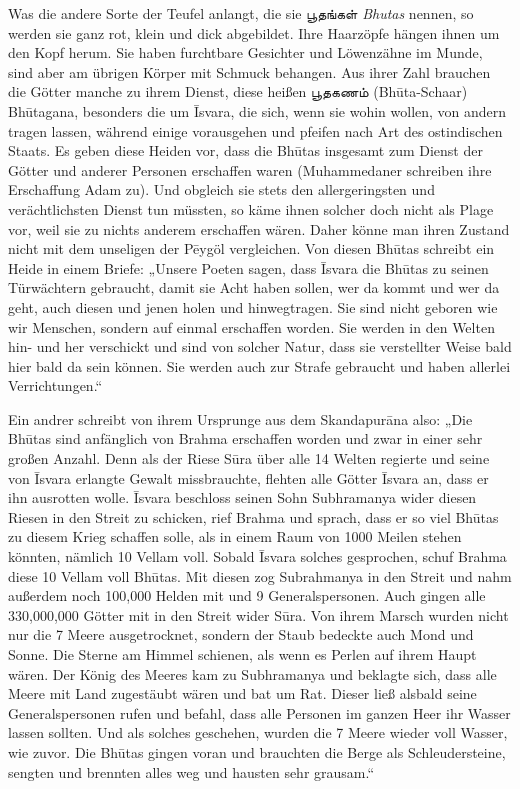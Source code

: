 \documentclass{article}
\newcommand{\TamilText}[1]{\texttamil{#1}}
\newcommand{\tam}[1]{\TamilText{#1}}
\begin{document}
Was die andere Sorte der Teufel anlangt, die sie \tam{பூதங்கள்} \emph{Bhutas} nennen, so werden sie ganz rot, klein und dick abgebildet. Ihre Haarzöpfe hängen ihnen um den Kopf herum. Sie haben furchtbare Gesichter und Löwenzähne im Munde, sind aber am übrigen Körper mit Schmuck behangen. Aus ihrer Zahl brauchen die Götter manche zu ihrem Dienst, diese heißen \tam{பூதகணம்} (Bh\={u}ta-Schaar) Bh\={u}tagana, besonders die um \={I}svara, die sich, wenn sie wohin wollen, von andern tragen lassen, während einige vorausgehen und pfeifen nach Art des ostindischen Staats. Es geben diese Heiden vor, dass die Bh\={u}tas insgesamt zum Dienst der Götter und anderer Personen erschaffen waren (Muhammedaner schreiben ihre Erschaffung Adam zu). Und obgleich sie stets den allergeringsten und verächtlichsten Dienst tun müssten, so käme ihnen solcher doch nicht als Plage vor, weil sie zu nichts anderem erschaffen wären. Daher könne man ihren Zustand nicht mit dem unseligen der P\={e}ygöl vergleichen. Von diesen Bh\={u}tas schreibt ein Heide in einem Briefe: „Unsere Poeten sagen, dass \={I}svara die Bh\={u}tas zu seinen Türwächtern gebraucht, damit sie Acht haben sollen, wer da kommt und wer da geht, auch diesen und jenen holen und hinwegtragen. Sie sind nicht geboren wie wir Menschen, sondern auf einmal erschaffen worden. Sie werden in den Welten hin- und her verschickt und sind von solcher Natur, dass sie verstellter Weise bald hier bald da sein können. Sie werden auch zur Strafe gebraucht und haben allerlei Verrichtungen.“

Ein andrer schreibt von ihrem Ursprunge aus dem Skandapur\={a}na also: „Die Bh\={u}tas sind anfänglich von Brahma erschaffen worden und zwar in einer sehr großen Anzahl. Denn als der Riese S\={u}ra über alle 14 Welten regierte und seine von \={I}svara erlangte Gewalt missbrauchte, flehten alle Götter \={I}svara an, dass er ihn ausrotten wolle. \={I}svara beschloss seinen Sohn Subhramanya wider diesen Riesen in den Streit zu schicken, rief Brahma und sprach, dass er so viel Bh\={u}tas zu diesem Krieg schaffen solle, als in einem Raum von 1000 Meilen stehen könnten, nämlich 10 Vellam voll. Sobald \={I}svara solches gesprochen, schuf Brahma diese 10 Vellam voll Bh\={u}tas. Mit diesen zog Subrahmanya in den Streit und nahm außerdem noch 100,000 Helden mit und 9 Generalspersonen. Auch gingen alle 330,000,000 Götter mit in den Streit wider S\={u}ra. Von ihrem Marsch wurden nicht nur die 7 Meere ausgetrocknet, sondern der Staub bedeckte auch Mond und Sonne. Die Sterne am Himmel schienen, als wenn es Perlen auf ihrem Haupt wären. Der König des Meeres kam zu Subhramanya und beklagte sich, dass alle Meere mit Land zugestäubt wären und bat um Rat. Dieser ließ alsbald seine Generalspersonen rufen und befahl, dass alle Personen im ganzen Heer ihr Wasser lassen sollten. Und als solches geschehen, wurden die 7 Meere wieder voll Wasser, wie zuvor. Die Bh\={u}tas gingen voran und brauchten die Berge als Schleudersteine, sengten und brennten alles weg und hausten sehr grausam.“
\end{document}
